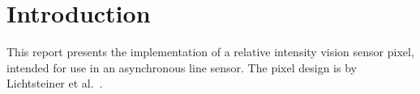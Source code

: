 \section{Introduction}
This report presents the implementation of a relative intensity vision sensor pixel, intended for use in 
an asynchronous line sensor. 
The pixel design is by Lichtsteiner et al.~\cite{Lichtsteiner2008}.


